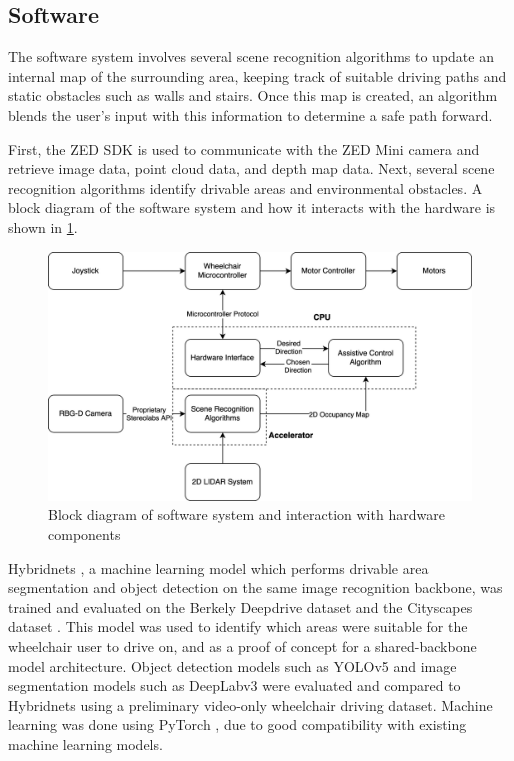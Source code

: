 \subsection{Software}
The software system involves several scene recognition algorithms to update an internal
map of the surrounding area, keeping track of suitable driving paths and static obstacles
such as walls and stairs. Once this map is created, an algorithm blends the
user's input with this information to determine a safe path forward.

First, the ZED SDK is used to communicate with the ZED Mini camera and retrieve image data,
point cloud data, and depth map data. Next, several scene recognition algorithms
identify drivable areas and environmental obstacles. A block diagram of the software system
and how it interacts with the hardware is shown in \cref{fig:block_diagram}.

\begin{figure}[b]
    \centering
    \includegraphics[width=0.9\linewidth]{images/block_diagram.png}
    \caption{Block diagram of software system and interaction with hardware components}
    \label{fig:block_diagram}
\end{figure}

Hybridnets \cite{vuHybridNetsEndtoEndPerception2022},
a machine learning model which performs drivable area segmentation and object detection on the same
image recognition backbone, was trained and evaluated on the Berkely Deepdrive dataset \cite{yuBDD100KDiverseDriving2018}
and the Cityscapes dataset \cite{cordtsCityscapesDatasetSemantic2016}. This model was used to identify
which areas were suitable for the wheelchair user to drive on,
and as a proof of concept for a shared-backbone model architecture.
Object detection models such as YOLOv5 \cite{ultralyticsYOLOv5} and image segmentation models such as
DeepLabv3 \cite{chenRethinkingAtrousConvolution2017} were evaluated and compared to Hybridnets using a preliminary
video-only wheelchair driving dataset.
Machine learning was done using PyTorch \cite{paszkePyTorchImperativeStyle2019}, due to good compatibility
with existing machine learning models.

